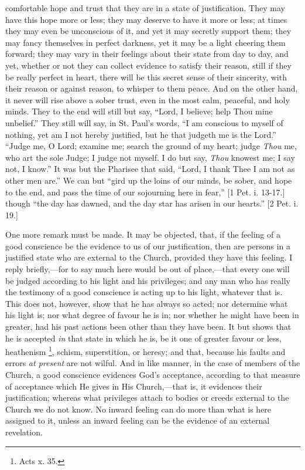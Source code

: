 comfortable hope and trust that they are in a state of justification.
They may have this hope more or less; they may deserve to have it more
or less; at times they may even be unconscious of it, and yet it may
secretly support them; they may fancy themselves in perfect darkness,
yet it may be a light cheering them forward; they may vary in their
feelings about their state from day to day, and yet, whether or not
they can collect evidence to satisfy their reason, still if they be
really perfect in heart, there will be this secret sense of their
sincerity, with their reason or against reason, to whisper to them
peace. And on the other hand, it never will rise above a sober trust,
even in the most calm, peaceful, and holy minds. They to the end will
still but say, ``Lord, I believe; help Thou mine unbelief.''
They still will say, in St. Paul's words, ``I am conscious to
myself of nothing, yet am I not hereby justified, but he that judgeth
me is the Lord.'' ``Judge me, O Lord; examine me; search the
ground of my heart; judge \emph{Thou} me, who art the sole Judge; I
judge not myself. I do but say, \emph{Thou} knowest me; I say not, I
know.'' It was but the Pharisee that said, ``Lord, I thank
Thee I am not as other men are.'' We can but ``gird up the
loins of our minds, be sober, and hope to the end, and pass the time
of our sojourning here in fear,'' [1 Pet. i. 13-17.] though
``the day has dawned, and the day star has arisen in our
hearts.'' [2 Pet. i. 19.]

One more remark must be made. It may be objected, that, if the
feeling of a good conscience be the evidence to us of our
justification, then are persons in a justified state who are external
to the Church, provided they have this feeling. I reply briefly,—for
to say much here would be out of place,—that every one will be
judged according to his light and his privileges; and any man who has
really the testimony of a good conscience is acting up to his light,
whatever that is. This does not, however, show that he has always so
acted; nor determine what his light is; nor what degree of favour he
is in; nor whether he might have been in greater, had his past actions
been other than they have been. It but shows that he is accepted \emph{in}
that state in which he is, be it one of greater favour or less,
heathenism \footnote{Acts x. 35.}, schism,
superstition, or heresy; and that, because his faults and errors \emph{at
present} are not wilful. And in like manner, in the case of members
of the Church, a good conscience evidences God's acceptance, according
to that measure of acceptance which He gives in His Church,—that is,
it evidences their justification; whereas what privileges attach to
bodies or creeds external to the Church we do not know. No inward
feeling can do more than what is here assigned to it, unless an inward
feeling can be the evidence of an external revelation.

